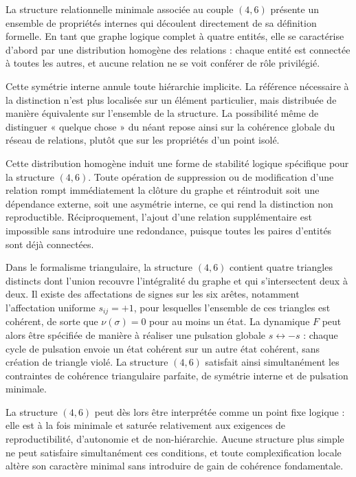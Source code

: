 \documentclass[11pt,a4paper]{article}
\begin{document}
La structure relationnelle minimale associée au couple \(\left(4,6\right)\) présente un ensemble de propriétés internes qui découlent directement de sa définition formelle. En tant que graphe logique complet à quatre entités, elle se caractérise d’abord par une distribution homogène des relations : chaque entité est connectée à toutes les autres, et aucune relation ne se voit conférer de rôle privilégié.

Cette symétrie interne annule toute hiérarchie implicite. La référence nécessaire à la distinction n’est plus localisée sur un élément particulier, mais distribuée de manière équivalente sur l’ensemble de la structure. La possibilité même de distinguer « quelque chose » du néant repose ainsi sur la cohérence globale du réseau de relations, plutôt que sur les propriétés d’un point isolé.

Cette distribution homogène induit une forme de stabilité logique spécifique pour la structure \(\left(4,6\right)\). Toute opération de suppression ou de modification d’une relation rompt immédiatement la clôture du graphe et réintroduit soit une dépendance externe, soit une asymétrie interne, ce qui rend la distinction non reproductible. Réciproquement, l’ajout d’une relation supplémentaire est impossible sans introduire une redondance, puisque toutes les paires d’entités sont déjà connectées.

Dans le formalisme triangulaire, la structure \(\left(4,6\right)\) contient quatre triangles distincts dont l’union recouvre l’intégralité du graphe et qui s’intersectent deux à deux. Il existe des affectations de signes sur les six arêtes, notamment l’affectation uniforme \(s_{ij}=+1\), pour lesquelles l’ensemble de ces triangles est cohérent, de sorte que \(\nu\left(\sigma\right)=0\) pour au moins un état. La dynamique \(F\) peut alors être spécifiée de manière à réaliser une pulsation globale \(s \leftrightarrow -s\) : chaque cycle de pulsation envoie un état cohérent sur un autre état cohérent, sans création de triangle violé. La structure \(\left(4,6\right)\) satisfait ainsi simultanément les contraintes de cohérence triangulaire parfaite, de symétrie interne et de pulsation minimale.

La structure \(\left(4,6\right)\) peut dès lors être interprétée comme un point fixe logique : elle est à la fois minimale et saturée relativement aux exigences de reproductibilité, d’autonomie et de non-hiérarchie. Aucune structure plus simple ne peut satisfaire simultanément ces conditions, et toute complexification locale altère son caractère minimal sans introduire de gain de cohérence fondamentale.
\end{document}

